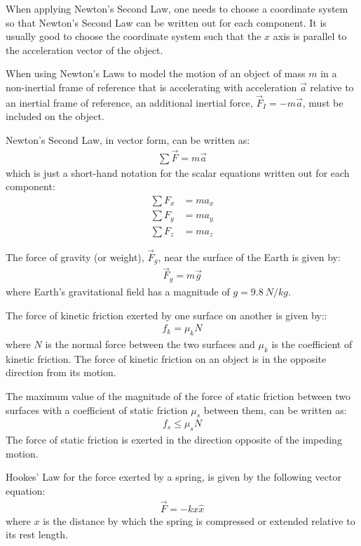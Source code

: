 \begin{chapterSummary}
When applying Newton's Second Law, one needs to choose a coordinate system so that Newton's Second Law can be written out for each component. It is usually good to choose the coordinate system such that the $x$ axis is parallel to the acceleration vector of the object.

When using Newton's Laws to model the motion of an object of mass $m$ in a non-inertial frame of reference that is accelerating with acceleration $\vec a$ relative to an inertial frame of reference, an additional inertial force, $\vec F_I=-m\vec a$, must be included on the object.
\end{chapterSummary}

\begin{importantEquations}
Newton's Second Law, in vector form, can be written as:
\begin{align*}
\sum \vec F = m\vec a
\end{align*}
which is just a short-hand notation for the scalar equations written out for each component:
\begin{align*}
\sum F_x &= ma_x \\
\sum F_y &= ma_y \\
\sum F_z &= ma_z
\end{align*}

The force of gravity (or weight), $\vec F_g$, near the surface of the Earth is given by:
\begin{align*}
\vec F_g = m\vec g
\end{align*}
where Earth's gravitational field has a magnitude of $g=\SI{9.8}{N/kg}$.

The force of kinetic friction exerted by one surface on another is given by::
\begin{align*}
f_k=\mu_kN
\end{align*}
where $N$ is the normal force between the two surfaces and $\mu_k$ is the coefficient of kinetic friction. The force of kinetic friction on an object is in the opposite direction from its motion.

The maximum value of the magnitude of the force of static friction between two surfaces with a coefficient of static friction $\mu_s$ between them, can be written as:
\begin{align*}
f_s\leq\mu_sN
\end{align*}
The force of static friction is exerted in the direction opposite of the impeding motion.

Hookes' Law for the force exerted by a spring, is given by the following vector equation:
\begin{align*}
\vec F = -kx \hat x
\end{align*}
where $x$ is the distance by which the spring is compressed or extended relative to its rest length.
\end{importantEquations}


